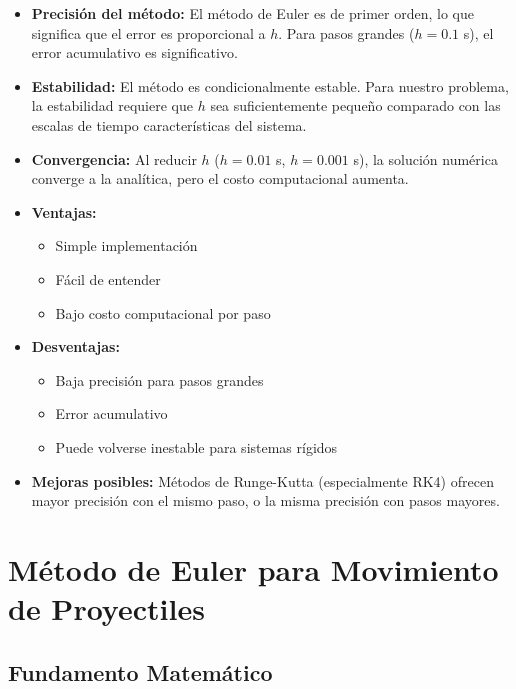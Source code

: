 \documentclass[12pt,a4paper]{article}
\begin{document}
\begin{itemize}
    \item \textbf{Precisión del método:} El método de Euler es de primer orden, lo que significa que el error es proporcional a $h$. Para pasos grandes ($h=0.1$ s), el error acumulativo es significativo.
    
    \item \textbf{Estabilidad:} El método es condicionalmente estable. Para nuestro problema, la estabilidad requiere que $h$ sea suficientemente pequeño comparado con las escalas de tiempo características del sistema.
    
    \item \textbf{Convergencia:} Al reducir $h$ ($h=0.01$ s, $h=0.001$ s), la solución numérica converge a la analítica, pero el costo computacional aumenta.
    
    \item \textbf{Ventajas:}
    \begin{itemize}
        \item Simple implementación
        \item Fácil de entender
        \item Bajo costo computacional por paso
    \end{itemize}
    
    \item \textbf{Desventajas:}
    \begin{itemize}
        \item Baja precisión para pasos grandes
        \item Error acumulativo
        \item Puede volverse inestable para sistemas rígidos
    \end{itemize}
    
    \item \textbf{Mejoras posibles:} Métodos de Runge-Kutta (especialmente RK4) ofrecen mayor precisión con el mismo paso, o la misma precisión con pasos mayores.
\end{itemize}



\section*{Método de Euler para Movimiento de Proyectiles}

\subsection*{Fundamento Matemático}
\end{document}
